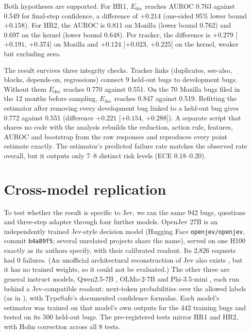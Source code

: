  Both hypotheses are supported. For HR1, $E_{\text{dec}}$
reaches AUROC 0.763 against 0.549 for final-step confidence, a
difference of $+0.214$ (one-sided 95\% lower bound $+0.158$). For HR2,
the AUROC is 0.811 on Mozilla (lower bound 0.762) and 0.697 on the
kernel (lower bound 0.648). Per tracker, the difference is $+0.279$
[$+0.191$, $+0.374$] on Mozilla and $+0.124$ [$+0.023$, $+0.225$] on the
kernel, weaker but excluding zero.

The result survives three integrity checks. Tracker links (duplicates,
see-also, blocks, depends-on, regressions) connect 9 held-out bugs to
development bugs. Without them $E_{\text{dec}}$ reaches 0.770 against
0.551. On the 70 Mozilla bugs filed in the 12 months before sampling,
$E_{\text{dec}}$ reaches 0.847 against 0.519. Refitting the estimator
after removing every development bug linked to a held-out bug gives
0.772 against 0.551 (difference $+0.221$ [$+0.154$, $+0.288$]). A
separate script that shares no code with the analysis rebuilds the
reduction, action rule, features, AUROC and bootstrap from the raw
responses and reproduces every point estimate exactly. The estimator's
predicted failure rate matches the observed rate overall, but it outputs
only 7--8 distinct risk levels (ECE 0.18--0.20).

\section{Cross-model replication}
\label{sec:crossmodel}

 To test whether the result is specific to Jev, we ran the
same 942 bugs, questions and three-step adapter through four further
models. OpenJev 27B \citep{openjev2026} is an independently trained
Jev-style decision model (Hugging Face \texttt{openjev/openjev}, commit
\texttt{b4a89f5}; several unrelated projects share the name), served on
one H100 exactly as its authors specify, with their calibrated readout.
Its 2{,}826 requests had 0 failures. (An unofficial architectural
reconstruction of Jev also exists \citep{gomez2026openjev}, but it has no
trained weights, so it could not be evaluated.) The other three are
general instruct models, Qwen2.5-7B \citep{qwen2024qwen25}, OLMo-2-7B
\citep{olmo2024olmo2} and Phi-3.5-mini \citep{abdin2024phi3}, each run
behind a Jev-compatible readout: next-token probabilities over the
allowed labels (as in \citep{geuter2026innerjev}), with TypeSafe's
documented confidence formulas.
Each model's estimator was trained on that model's own outputs for the
442 training bugs and tested on its 500 held-out bugs. The pre-registered
tests mirror HR1 and HR2, with Holm correction across all 8 tests.

